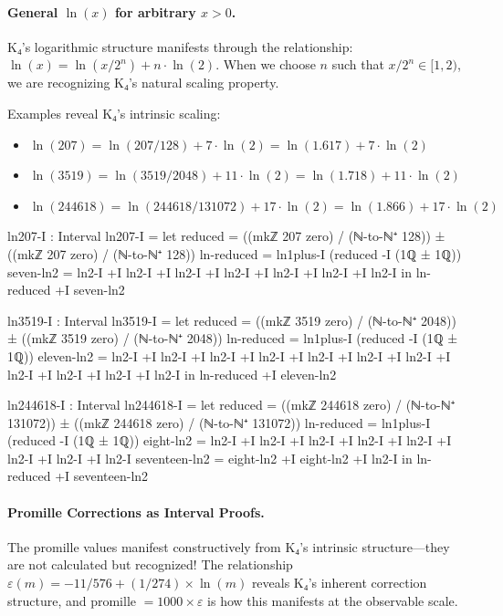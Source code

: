 \documentclass[11pt,a4paper]{book}
\begin{document}
\paragraph{General $\ln(x)$ for arbitrary $x > 0$.}
K₄'s logarithmic structure manifests through the relationship: $\ln(x) = \ln(x/2^n) + n \cdot \ln(2)$.
When we choose $n$ such that $x/2^n \in [1, 2)$, we are recognizing K₄'s natural scaling property.

Examples reveal K₄'s intrinsic scaling:
\begin{itemize}
\item $\ln(207) = \ln(207/128) + 7 \cdot \ln(2) = \ln(1.617) + 7 \cdot \ln(2)$
\item $\ln(3519) = \ln(3519/2048) + 11 \cdot \ln(2) = \ln(1.718) + 11 \cdot \ln(2)$
\item $\ln(244618) = \ln(244618/131072) + 17 \cdot \ln(2) = \ln(1.866) + 17 \cdot \ln(2)$
\end{itemize}

\begin{code}
ln207-I : Interval
ln207-I = 
  let reduced = ((mkℤ 207 zero) / (ℕ-to-ℕ⁺ 128)) ± ((mkℤ 207 zero) / (ℕ-to-ℕ⁺ 128))
      ln-reduced = ln1plus-I (reduced -I (1ℚ ± 1ℚ))
      seven-ln2 = ln2-I +I ln2-I +I ln2-I +I ln2-I +I ln2-I +I ln2-I +I ln2-I
  in ln-reduced +I seven-ln2

ln3519-I : Interval
ln3519-I = 
  let reduced = ((mkℤ 3519 zero) / (ℕ-to-ℕ⁺ 2048)) ± ((mkℤ 3519 zero) / (ℕ-to-ℕ⁺ 2048))
      ln-reduced = ln1plus-I (reduced -I (1ℚ ± 1ℚ))
      eleven-ln2 = ln2-I +I ln2-I +I ln2-I +I ln2-I +I ln2-I +I ln2-I +I ln2-I +I ln2-I +I ln2-I +I ln2-I +I ln2-I
  in ln-reduced +I eleven-ln2

ln244618-I : Interval
ln244618-I = 
  let reduced = ((mkℤ 244618 zero) / (ℕ-to-ℕ⁺ 131072)) ± ((mkℤ 244618 zero) / (ℕ-to-ℕ⁺ 131072))
      ln-reduced = ln1plus-I (reduced -I (1ℚ ± 1ℚ))
      eight-ln2 = ln2-I +I ln2-I +I ln2-I +I ln2-I +I ln2-I +I ln2-I +I ln2-I +I ln2-I
      seventeen-ln2 = eight-ln2 +I eight-ln2 +I ln2-I
  in ln-reduced +I seventeen-ln2

\end{code}

\paragraph{Promille Corrections as Interval Proofs.}
The promille values manifest constructively from K₄'s intrinsic structure—they are not calculated but recognized!
The relationship $\varepsilon(m) = -11/576 + (1/274) \times \ln(m)$ reveals K₄'s inherent correction structure, and
promille $= 1000 \times \varepsilon$ is how this manifests at the observable scale.
\end{document}
